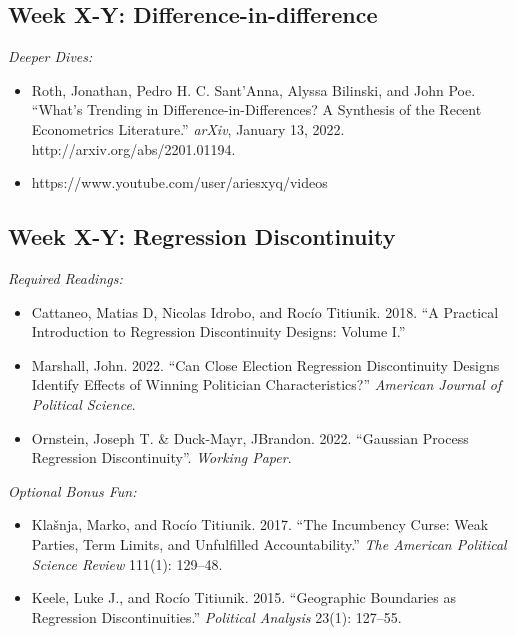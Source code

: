 \documentclass[11pt, letterpaper]{article}
\begin{document}
\subsection*{Week X-Y: Difference-in-difference}

\textit{Deeper Dives:}

\begin{itemize}
	\item Roth, Jonathan, Pedro H. C. Sant’Anna, Alyssa Bilinski, and John Poe. ``What’s Trending in Difference-in-Differences? A Synthesis of the Recent Econometrics Literature.'' \textit{arXiv}, January 13, 2022. http://arxiv.org/abs/2201.01194.
	\item https://www.youtube.com/user/ariesxyq/videos
\end{itemize}



\subsection*{Week X-Y: Regression Discontinuity}

\textit{Required Readings:}

\begin{itemize}
	
	\item Cattaneo, Matias D, Nicolas Idrobo, and Rocío Titiunik. 2018. ``A Practical Introduction to Regression Discontinuity Designs: Volume I.''
	\item Marshall, John. 2022. ``Can Close Election Regression Discontinuity Designs Identify Effects of Winning Politician Characteristics?'' \textit{American Journal of Political Science}.
	\item Ornstein, Joseph T. \& Duck-Mayr, JBrandon. 2022. ``Gaussian Process Regression Discontinuity''. \textit{Working Paper}.
\end{itemize}

\noindent \textit{Optional Bonus Fun:}

\begin{itemize}
	\item Klašnja, Marko, and Rocío Titiunik. 2017. ``The Incumbency Curse: Weak Parties, Term Limits, and Unfulfilled Accountability.'' \textit{The American Political Science Review} 111(1): 129–48.
	\item Keele, Luke J., and Rocío Titiunik. 2015. ``Geographic Boundaries as Regression Discontinuities.'' \textit{Political Analysis} 23(1): 127–55.
	
\end{itemize}
\end{document}
